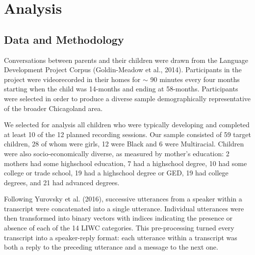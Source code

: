 \documentclass[10pt, letterpaper]{article}
\begin{document}
\hypertarget{analysis}{%
\section{Analysis}\label{analysis}}

\hypertarget{data-and-methodology}{%
\subsection{Data and Methodology}\label{data-and-methodology}}

Conversations between parents and their children were drawn from the
Language Development Project Corpus (Goldin-Meadow et al., 2014).
Participants in the project were videorecorded in their homes for
\(\sim\) 90 minutes every four months starting when the child was
14-months and ending at 58-months. Participants were selected in order
to produce a diverse sample demographically representative of the
broader Chicagoland area.

We selected for analysis all children who were typically developing and
completed at least 10 of the 12 planned recording sessions. Our sample
consisted of 59 target children, 28 of whom were girls, 12 were Black
and 6 were Multiracial. Children were also socio-economically diverse,
as measured by mother's education: 2 mothers had some highschool
education, 7 had a highschool degree, 10 had some college or trade
school, 19 had a highschool degree or GED, 19 had college degrees, and
21 had advanced degrees.

Following Yurovsky et al. (2016), successive utterances from a speaker
within a transcript were concatenated into a single utterance.
Individual utterances were then transformed into binary vectors with
indices indicating the presence or absence of each of the 14 LIWC
categories. This pre-processing turned every transcript into a
speaker-reply format: each utterance within a transcript was both a
reply to the preceding utterance and a message to the next one.
\end{document}
